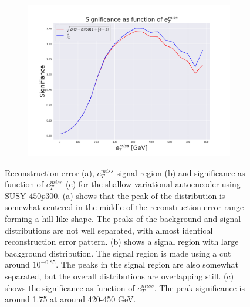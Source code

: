 \begin{figure}[!htb]
    \hfill  
    \begin{subfigure}{.49\textwidth}
        \includegraphics[width=\textwidth]{Figures/VAE_testing/small/2lep/significance_etmiss_450p0p0300_-0.8484803499636524.pdf}
        \caption{}
        \label{fig:VAE_2lep_small_signi_450}
    \end{subfigure}
    \hfill      
    \caption[2lep shallow network | $450p300$ | VAE]{Reconstruction error (a), $e_T^{miss}$ signal region (b) and significance as function of 
    $e_T^{miss}$ (c) for the shallow variational autoencoder using SUSY $450p300$.
    (a) shows that the peak of the distribution is somewhat centered in the middle 
    of the reconstruction error range forming a hill-like shape. The peaks of the background and signal 
    distributions are not well separated, with almost identical reconstruction error pattern. (b) 
    shows a signal region with large background distribution. The signal region is made using a cut around
    $10^{-0.85}$. The peaks in the signal region are also somewhat 
    separated, but the overall distributions are overlapping still. 
    (c) shows the significance as function of $e_T^{miss}$. 
The peak significance is around 1.75 at around 420-450 GeV.}
    \label{fig:VAE_2lep_small_rec_sig_signi_450}
\end{figure}


